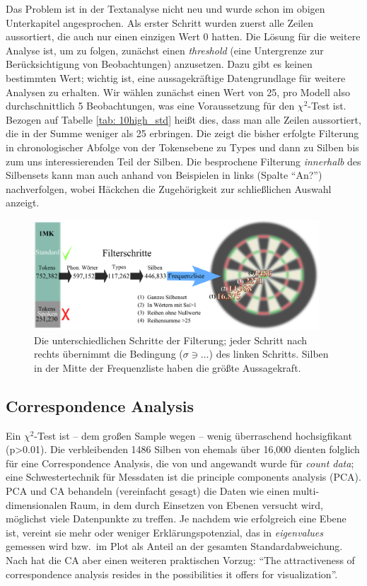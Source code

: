\documentclass[12pt,headsepline,a4paper]{scrartcl}
\begin{document}
Das Problem ist in der Textanalyse nicht neu und wurde schon im obigen Unterkapitel angesprochen. Als erster Schritt wurden zuerst alle Zeilen aussortiert, die auch nur einen einzigen Wert 0 hatten. Die Lösung für die weitere Analyse ist, um \textcite{lebart1998} zu folgen, zunächst einen \textit{threshold} (eine Untergrenze zur Berücksichtigung von Beobachtungen) anzusetzen. Dazu gibt es keinen bestimmten Wert; wichtig ist, eine aussagekräftige Datengrundlage für weitere Analysen zu erhalten. Wir wählen zunächst einen Wert von 25, pro Modell also durchschnittlich 5 Beobachtungen, was eine Voraussetzung für den $\chi^2$-Test ist. Bezogen auf Tabelle \ref{tab: 10high_std} heißt dies, dass man alle Zeilen aussortiert, die in der Summe weniger als 25 erbringen. 
Die  zeigt die bisher erfolgte Filterung in chronologischer Abfolge von der Tokensebene zu Types und dann zu Silben bis zum uns interessierenden Teil der Silben. Die besprochene Filterung \textit{innerhalb} des Silbensets kann man auch anhand von Beispielen in  links (Spalte "`An?"') nachverfolgen, wobei Häckchen die Zugehörigkeit zur schließlichen Auswahl anzeigt. 
 
\begin{figure}[htbp]
\centering  
\includegraphics[width=0.95\textwidth]{figures/freq_map2.png}
\caption{Die unterschiedlichen Schritte der Filterung; jeder Schritt nach rechts übernimmt die Bedingung ($\sigma \ni \ldots$) des linken Schritts. Silben in der Mitte der Frequenzliste haben die größte Aussagekraft.}
\label{fig: freq_map}
\end{figure} 

\subsection{Correspondence Analysis}
Ein $\chi^2$-Test ist -- dem großen Sample wegen -- wenig überraschend hochsigfikant (p>0.01). Die verbleibenden 1486 Silben von ehemals über 16,000 dienten folglich für eine Correspondence Analysis, die von \textcite{baayen2008} und \textcite{lebart1998} angewandt wurde für \textit{count data}; eine Schwestertechnik für Messdaten ist die principle components analysis (PCA). PCA und CA behandeln (vereinfacht gesagt) die Daten wie einen multi-dimensionalen Raum, in dem durch Einsetzen von Ebenen versucht wird, möglichst viele Datenpunkte zu treffen. Je nachdem wie erfolgreich eine Ebene ist, vereint sie mehr oder weniger Erklärungspotenzial, das in \textit{eigenvalues} gemessen wird bzw.\ im Plot als Anteil an der gesamten Standardabweichung. Nach \textcite[141]{baayen2008} hat die CA aber einen weiteren praktischen Vorzug: "`The attractiveness of correspondence analysis resides in the possibilities it offers for visualization"'. 
\end{document}
